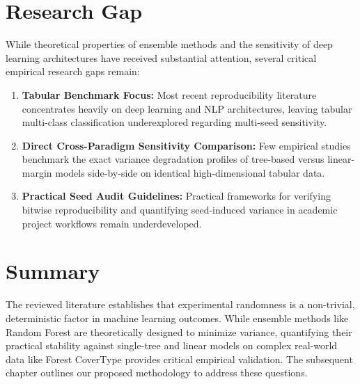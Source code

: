\section{Research Gap}
\label{sec:research_gap}

While theoretical properties of ensemble methods and the sensitivity of deep learning architectures have received substantial attention, several critical empirical research gaps remain:
\begin{enumerate}
    \item \textbf{Tabular Benchmark Focus:} Most recent reproducibility literature concentrates heavily on deep learning and NLP architectures, leaving tabular multi-class classification underexplored regarding multi-seed sensitivity.
    \item \textbf{Direct Cross-Paradigm Sensitivity Comparison:} Few empirical studies benchmark the exact variance degradation profiles of tree-based versus linear-margin models side-by-side on identical high-dimensional tabular data.
    \item \textbf{Practical Seed Audit Guidelines:} Practical frameworks for verifying bitwise reproducibility and quantifying seed-induced variance in academic project workflows remain underdeveloped.
\end{enumerate}

\section{Summary}
\label{sec:lit_summary}

The reviewed literature establishes that experimental randomness is a non-trivial, deterministic factor in machine learning outcomes. While ensemble methods like Random Forest are theoretically designed to minimize variance, quantifying their practical stability against single-tree and linear models on complex real-world data like Forest CoverType provides critical empirical validation. The subsequent chapter outlines our proposed methodology to address these questions.
